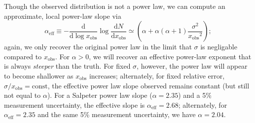 \documentclass[modern]{aastex62}
\newcommand{\dd}{\ensuremath{\mathrm{d}}}
\newcommand{\diff}[2]{\ensuremath{\frac{\dd #1}{\dd #2}}}
\newcommand{\aeff}{\ensuremath{\alpha_\mathrm{eff}}}
\newcommand{\xobs}{\ensuremath{x_\mathrm{obs}}}
\begin{document}
Though the observed distribution is not a power law, we can compute an approximate, local power-law slope via
%
\begin{equation}
  \aeff \equiv - \diff{}{\log \xobs} \log \diff{N}{\xobs} \simeq \left( \alpha + \alpha \left( \alpha+1 \right) \frac{\sigma^2}{\xobs^2} \right);
\end{equation}
%
again, we only recover the original power law in the limit that $\sigma$ is
negligable compared to $\xobs$.  For $\alpha > 0$, we will recover an effective
power-law exponent that is always \emph{steeper} than the truth.  For fixed
$\sigma$, however, the power law will appear to become shallower as $\xobs$
increases; alternately, for fixed relative error, $\sigma / \xobs =
\mathrm{const}$, the effective power law slope observed remains constant (but
still not equal to $\alpha$).  For a Salpeter power law slope ($\alpha = 2.35$)
and a 5\% measurement uncertainty, the effective slope is $\aeff = 2.68$;
alternately, for $\aeff = 2.35$ and the same 5\% measurement uncertainty, we
have $\alpha = 2.04$.

\newpage


\end{document}
